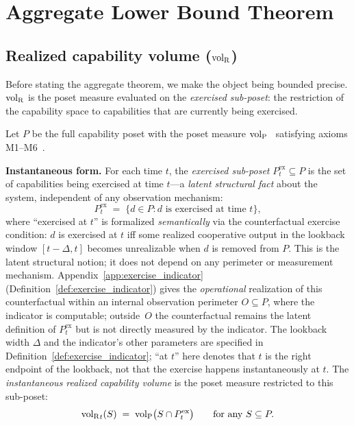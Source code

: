 \section{Aggregate Lower Bound Theorem}
\label{sec:lower_bound}

\subsection{Realized capability volume (${\operatorname{vol}_{\mathrm{R}}}$)}

Before stating the aggregate theorem, we make the object being
bounded precise.  ${\operatorname{vol}_{\mathrm{R}}}$ is the poset measure evaluated on the
\emph{exercised sub-poset}: the restriction of the capability
space to capabilities that are currently being exercised.

\begin{definition}
\label{def:volR}
Let $P$ be the full capability poset with the poset measure
${\operatorname{vol}_{\mathrm{P}}}$~\citep[Definition~7]{lasser2026poset} satisfying axioms
M1--M6~\citep[Proposition~1]{lasser2026poset}.

\medskip\noindent
\textbf{Instantaneous form.}
For each time $t$, the \emph{exercised sub-poset}
$P^{\mathrm{ex}}_t \subseteq P$ is the set of capabilities being
exercised at time $t$---a \emph{latent structural fact} about
the system, independent of any observation mechanism:
\[
  P^{\mathrm{ex}}_t \;=\; \{d \in P : d \text{ is exercised at
  time } t\},
\]
where ``exercised at $t$'' is formalized
\emph{semantically} via the counterfactual exercise condition:
$d$ is exercised at $t$ iff some realized cooperative output in
the lookback window $[t - \Delta, t]$ becomes unrealizable when
$d$ is removed from $P$.  This is the latent structural notion;
it does not depend on any perimeter or measurement mechanism.
Appendix~\ref{app:exercise_indicator}
(Definition~\ref{def:exercise_indicator}) gives the
\emph{operational} realization of this counterfactual within an
internal observation perimeter $O \subseteq P$, where the
indicator is computable; outside~$O$ the counterfactual remains
the latent definition of $P^{\mathrm{ex}}_t$ but is not
directly measured by the indicator.  The lookback width
$\Delta$ and the indicator's other parameters are specified in
Definition~\ref{def:exercise_indicator}; ``at $t$'' here
denotes that $t$ is the right endpoint of the lookback,
not that the exercise happens instantaneously at $t$.  The \emph{instantaneous
realized capability volume} is the poset measure restricted to
this sub-poset:
\[
  {\operatorname{vol}_{\mathrm{R}}}_t(S) \;=\; {\operatorname{vol}_{\mathrm{P}}}\bigl(S \cap P^{\mathrm{ex}}_t\bigr)
  \qquad \text{for any } S \subseteq P.
\]


\end{definition}
